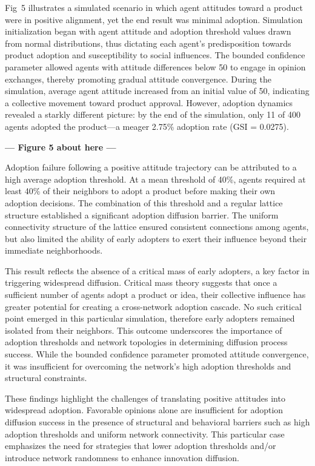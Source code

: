 \documentclass[10pt,letterpaper]{article}
\begin{document}
Fig~5 illustrates a simulated scenario in which agent attitudes toward a product were in positive alignment, yet the end result was minimal adoption. Simulation initialization began with agent attitude and adoption threshold values drawn from normal distributions, thus dictating each agent's predisposition towards product adoption and susceptibility to social influences. The bounded confidence parameter allowed agents with attitude differences below 50 to engage in opinion exchanges, thereby promoting gradual attitude convergence. During the simulation, average agent attitude increased from an initial value of 50, indicating a collective movement toward product approval. However, adoption dynamics revealed a starkly different picture: by the end of the simulation, only 11 of 400 agents adopted the product---a meager 2.75\% adoption rate (GSI = 0.0275).



\begin{center}\textbf{--- Figure 5 about here ---}\end{center}


Adoption failure following a positive attitude trajectory can be attributed to a high average adoption threshold. At a mean threshold of 40\%, agents required at least 40\% of their neighbors to adopt a product before making their own adoption decisions. The combination of this threshold and a regular lattice structure established a significant adoption diffusion barrier. The uniform connectivity structure of the lattice ensured consistent connections among agents, but also limited the ability of early adopters to exert their influence beyond their immediate neighborhoods.

This result reflects the absence of a critical mass of early adopters, a key factor in triggering widespread diffusion. Critical mass theory suggests that once a sufficient number of agents adopt a product or idea, their collective influence has greater potential for creating a cross-network adoption cascade. No such critical point emerged in this particular simulation, therefore early adopters remained isolated from their neighbors. This outcome underscores the importance of adoption thresholds and network topologies in determining diffusion process success. While the bounded confidence parameter promoted attitude convergence, it was insufficient for overcoming the network's high adoption thresholds and structural constraints.

These findings highlight the challenges of translating positive attitudes into widespread adoption. Favorable opinions alone are insufficient for adoption diffusion success in the presence of structural and behavioral barriers such as high adoption thresholds and uniform network connectivity. This particular case emphasizes the need for strategies that lower adoption thresholds and/or introduce network randomness to enhance innovation diffusion.
\end{document}
